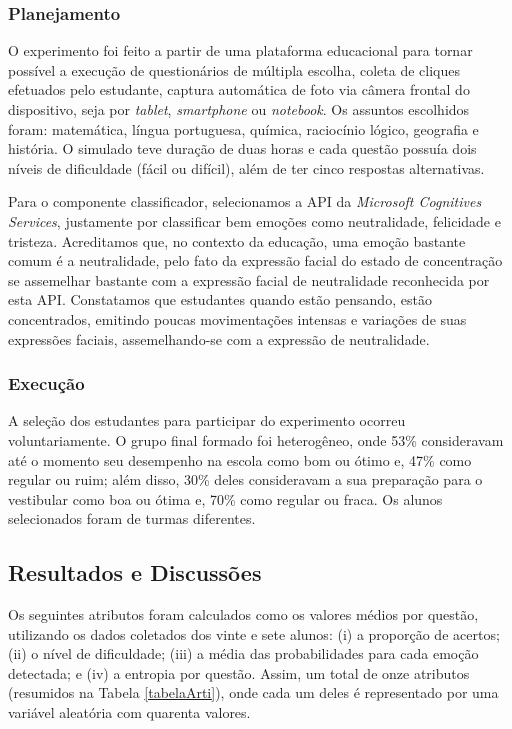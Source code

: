 \subsubsection{Planejamento}\label{sec:plan}
O experimento foi feito a partir de uma plataforma educacional para tornar possível a execução de questionários de múltipla escolha, coleta de cliques efetuados pelo estudante, captura automática de foto via câmera frontal do dispositivo, seja por \textit{tablet}, \textit{smartphone} ou \textit{notebook}. Os assuntos escolhidos foram: matemática, língua portuguesa, química, raciocínio lógico, geografia e história. O simulado teve duração de duas horas e cada questão possuía dois níveis de dificuldade (fácil ou difícil), além de ter cinco respostas alternativas.

Para o componente classificador, selecionamos a API da \textit{Microsoft Cognitives Services}, justamente por classificar bem emoções como neutralidade, felicidade e tristeza. Acreditamos que, no contexto da educação, uma emoção bastante comum é a neutralidade, pelo fato da expressão facial do estado de concentração se assemelhar bastante com a expressão facial de neutralidade reconhecida por esta API. Constatamos que estudantes quando estão pensando, estão concentrados, emitindo poucas movimentações intensas e variações de suas expressões faciais, assemelhando-se com a expressão de neutralidade.

\subsubsection{Execução}
A seleção dos estudantes para participar do experimento ocorreu voluntariamente. O grupo final formado foi heterogêneo, onde 53\% consideravam até o momento seu desempenho na escola como bom ou ótimo e, 47\% como regular ou ruim; além disso, 30\% deles consideravam a sua preparação para o vestibular como boa ou ótima e, 70\% como regular ou fraca. Os alunos selecionados foram de turmas diferentes.

\subsection{Resultados e Discussões}
Os seguintes atributos foram calculados como os valores médios por questão, utilizando os dados coletados dos vinte e sete alunos: (i) a proporção de acertos; (ii) o nível de dificuldade; (iii) a média das probabilidades para cada emoção detectada; e (iv) a entropia por questão. Assim, um total de onze atributos (resumidos na Tabela \ref{tabelaArti}), onde cada um deles é representado por uma variável aleatória com quarenta valores.

